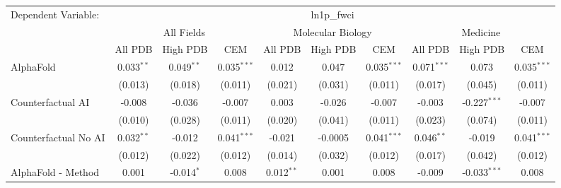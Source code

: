 \begingroup
\centering
\begin{tabular}{lccccccccc}
   \tabularnewline \midrule \midrule
   Dependent Variable: & \multicolumn{9}{c}{ln1p\_fwci}\\
 & \multicolumn{3}{c}{All Fields} & \multicolumn{3}{c}{Molecular Biology} & \multicolumn{3}{c}{Medicine} \\
\cmidrule(lr){2-7} \cmidrule(lr){5-10} \cmidrule(lr){8-7}
 & \multicolumn{1}{c}{All PDB} & \multicolumn{1}{c}{High PDB} & \multicolumn{1}{c}{CEM} & \multicolumn{1}{c}{All PDB} & \multicolumn{1}{c}{High PDB} & \multicolumn{1}{c}{CEM} & \multicolumn{1}{c}{All PDB} & \multicolumn{1}{c}{High PDB} & \multicolumn{1}{c}{CEM} \\
\cmidrule(lr){2-3} \cmidrule(lr){3-4} \cmidrule(lr){4-5} \cmidrule(lr){5-6} \cmidrule(lr){6-7} \cmidrule(lr){7-8} \cmidrule(lr){8-9} \cmidrule(lr){9-10} \cmidrule(lr){10-3}
   AlphaFold                                                   & 0.033$^{**}$  & 0.049$^{**}$  & 0.035$^{***}$ & 0.012          & 0.047        & 0.035$^{***}$ & 0.071$^{***}$ & 0.073          & 0.035$^{***}$\\   
                                                               & (0.013)       & (0.018)       & (0.011)       & (0.021)        & (0.031)      & (0.011)       & (0.017)       & (0.045)        & (0.011)\\   
   Counterfactual AI                                           & -0.008        & -0.036        & -0.007        & 0.003          & -0.026       & -0.007        & -0.003        & -0.227$^{***}$ & -0.007\\   
                                                               & (0.010)       & (0.028)       & (0.011)       & (0.020)        & (0.041)      & (0.011)       & (0.023)       & (0.074)        & (0.011)\\   
   Counterfactual No AI                                        & 0.032$^{**}$  & -0.012        & 0.041$^{***}$ & -0.021         & -0.0005      & 0.041$^{***}$ & 0.046$^{**}$  & -0.019         & 0.041$^{***}$\\   
                                                               & (0.012)       & (0.022)       & (0.012)       & (0.014)        & (0.032)      & (0.012)       & (0.017)       & (0.042)        & (0.012)\\   
   AlphaFold - Method                                          & 0.001         & -0.014$^{*}$  & 0.008         & 0.012$^{**}$   & 0.001        & 0.008         & -0.009        & -0.033$^{***}$ & 0.008\\   

\end{tabular}
